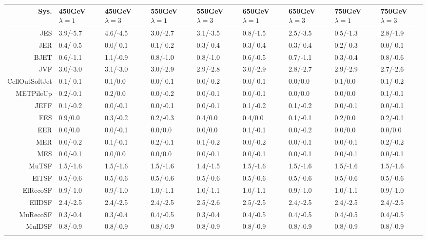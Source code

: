 \begin{tabular}{r|p{.08\linewidth}p{.08\linewidth}p{.08\linewidth}p{.08\linewidth}p{.08\linewidth}p{.08\linewidth}p{.08\linewidth}p{.08\linewidth}}
\toprule
 Sys.  & 450GeV $\lambda=1$  & 450GeV $\lambda=3$  & 550GeV $\lambda=1$  & 550GeV $\lambda=3$  & 650GeV $\lambda=1$  & 650GeV $\lambda=3$  & 750GeV $\lambda=1$  & 750GeV $\lambda=3$  \\
\toprule
JES  & 3.9/-5.7 & 4.6/-4.5 & 3.0/-2.7 & 3.1/-3.5 & 0.8/-1.5 & 2.5/-3.5 & 0.5/-1.3 & 2.8/-1.9 \\
JER  & 0.4/-0.5 & 0.0/-0.1 & 0.1/-0.2 & 0.3/-0.4 & 0.3/-0.4 & 0.3/-0.4 & 0.2/-0.3 & 0.0/-0.1 \\
BJET  & 0.6/-1.1 & 1.1/-0.9 & 0.8/-1.0 & 0.8/-1.0 & 0.6/-0.5 & 0.7/-1.1 & 0.3/-0.4 & 0.8/-0.6 \\
JVF  & 3.0/-3.0 & 3.1/-3.0 & 3.0/-2.9 & 2.9/-2.8 & 3.0/-2.9 & 2.8/-2.7 & 2.9/-2.9 & 2.7/-2.6 \\
CellOutSoftJet  & 0.1/-0.1 & 0.1/0.0 & 0.0/-0.1 & 0.0/-0.2 & 0.0/-0.1 & 0.0/0.0 & 0.1/0.0 & 0.1/-0.2 \\
METPileUp  & 0.2/-0.1 & 0.2/0.0 & 0.0/-0.2 & 0.0/-0.1 & 0.0/-0.1 & 0.0/0.0 & 0.0/0.0 & 0.1/-0.1 \\
JEFF  & 0.1/-0.2 & 0.0/-0.1 & 0.0/-0.1 & 0.0/-0.1 & 0.1/-0.2 & 0.1/-0.2 & 0.0/-0.1 & 0.0/-0.1 \\
EES  & 0.9/0.0 & 0.3/-0.2 & 0.2/-0.3 & 0.4/0.0 & 0.4/0.0 & 0.1/-0.1 & 0.2/0.0 & 0.2/-0.1 \\
EER  & 0.0/0.0 & 0.0/-0.1 & 0.0/0.0 & 0.0/0.0 & 0.1/-0.1 & 0.0/-0.2 & 0.0/0.0 & 0.0/0.0 \\
MER  & 0.0/-0.2 & 0.1/-0.1 & 0.2/-0.1 & 0.1/-0.2 & 0.0/-0.2 & 0.0/-0.1 & 0.0/-0.1 & 0.2/-0.2 \\
MES  & 0.0/-0.1 & 0.0/0.0 & 0.0/0.0 & 0.0/-0.1 & 0.0/-0.1 & 0.0/-0.1 & 0.0/-0.1 & 0.0/-0.1 \\
MuTSF  & 1.5/-1.6 & 1.5/-1.6 & 1.5/-1.6 & 1.4/-1.5 & 1.5/-1.6 & 1.5/-1.6 & 1.5/-1.6 & 1.5/-1.6 \\
ElTSF  & 0.5/-0.6 & 0.5/-0.6 & 0.5/-0.6 & 0.5/-0.6 & 0.5/-0.6 & 0.5/-0.6 & 0.5/-0.6 & 0.5/-0.6 \\
ElRecoSF  & 0.9/-1.0 & 0.9/-1.0 & 1.0/-1.1 & 1.0/-1.1 & 1.0/-1.1 & 0.9/-1.0 & 1.0/-1.1 & 0.9/-1.0 \\
ElIDSF  & 2.4/-2.5 & 2.4/-2.5 & 2.4/-2.5 & 2.5/-2.6 & 2.5/-2.5 & 2.4/-2.5 & 2.4/-2.5 & 2.4/-2.5 \\
MuRecoSF  & 0.3/-0.4 & 0.3/-0.4 & 0.4/-0.5 & 0.3/-0.4 & 0.4/-0.5 & 0.4/-0.5 & 0.4/-0.5 & 0.4/-0.5 \\
MuIDSF  & 0.8/-0.9 & 0.8/-0.9 & 0.8/-0.9 & 0.8/-0.9 & 0.8/-0.9 & 0.8/-0.9 & 0.8/-0.9 & 0.8/-0.9 \\
 \\
\bottomrule
\end{tabular}
